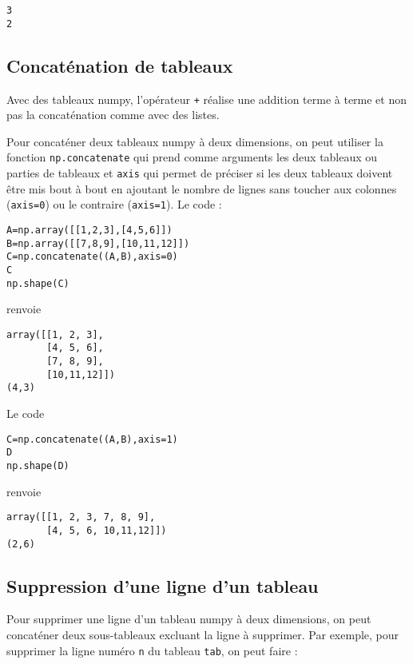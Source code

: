 \begin{verbatim}
3
2
\end{verbatim}

\subsection{Concaténation de tableaux}

Avec des tableaux numpy, l'opérateur \verb|+| réalise une addition terme à terme et non pas la concaténation comme avec des listes.

Pour concaténer deux tableaux numpy à deux dimensions, on peut utiliser la fonction \verb|np.concatenate| qui prend comme arguments les deux tableaux ou parties de tableaux et \verb|axis| qui permet de préciser si les deux tableaux doivent être mis bout à bout en ajoutant le nombre de lignes sans toucher aux colonnes (\verb|axis=0|) ou le contraire (\verb|axis=1|). Le code :

\begin{verbatim}
A=np.array([[1,2,3],[4,5,6]])
B=np.array([[7,8,9],[10,11,12]])
C=np.concatenate((A,B),axis=0)
C
np.shape(C)
\end{verbatim}

renvoie 

\begin{verbatim}
array([[1, 2, 3],
       [4, 5, 6],
       [7, 8, 9],
       [10,11,12]])
(4,3)
\end{verbatim} 

Le code

\begin{verbatim}
C=np.concatenate((A,B),axis=1)
D
np.shape(D)
\end{verbatim}

renvoie 

\begin{verbatim}
array([[1, 2, 3, 7, 8, 9],
       [4, 5, 6, 10,11,12]])
(2,6)
\end{verbatim}

\subsection{Suppression d'une ligne d'un tableau}

Pour supprimer une ligne d'un tableau numpy à deux dimensions, on peut concaténer deux sous-tableaux excluant la ligne à supprimer. Par exemple, pour supprimer la ligne numéro \verb|n| du tableau \verb|tab|, on peut faire :

